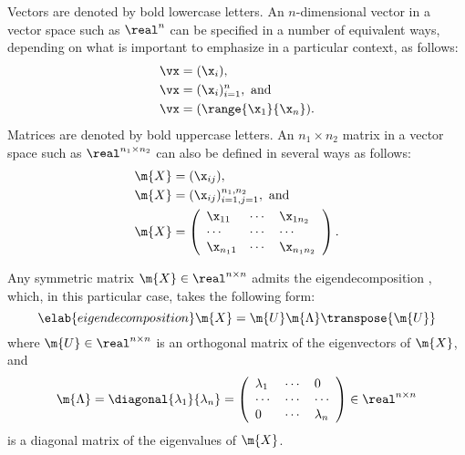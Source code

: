 Vectors are denoted by bold lowercase letters. An $n$-dimensional vector \vx in
a vector space such as $\real^n$ can be specified in a number of equivalent
ways, depending on what is important to emphasize in a particular context, as
follows:
\begin{align*}
  & \vx = (\x_i), \\
  & \vx = (\x_i)_{i = 1}^n, \text{ and} \\
  & \vx = (\range{\x_1}{\x_n}).
\end{align*}
Matrices are denoted by bold uppercase letters. An $n_1 \times n_2$ matrix in a
vector space such as $\real^{n_1 \times n_2}$ can also be defined in several
ways as follows:
\begin{align*}
  & \m{X} = (\x_{ij}), \\
  & \m{X} = (\x_{ij})_{i = 1, j = 1}^{n_1, n_2}, \text{ and} \\
  & \m{X} = \left(
    \begin{array}{lll}
      \x_{1 1}   & \cdots & \x_{1 n_2}   \\
      \cdots     & \cdots & \cdots       \\
      \x_{n_1 1} & \cdots & \x_{n_1 n_2}
    \end{array}
  \right).
\end{align*}

Any symmetric matrix $\m{X} \in \real^{n \times n}$ admits the
eigendecomposition \cite{press2007}, which, in this particular case, takes the
following form:
\begin{equation} \elab{eigendecomposition}
  \m{X} = \m{U} \m{\Lambda} \transpose{\m{U}}
\end{equation}
where $\m{U} \in \real^{n \times n}$ is an orthogonal matrix of the eigenvectors
of $\m{X}$, and
\[
  \m{\Lambda} = \diagonal{\lambda_1}{\lambda_n} = \left(
    \begin{array}{lll}
      \lambda_1 & \cdots & 0         \\
      \cdots    & \cdots & \cdots    \\
      0         & \cdots & \lambda_n
    \end{array}
  \right) \in \real^{n \times n}
\]
is a diagonal matrix of the eigenvalues of $\m{X}$.
